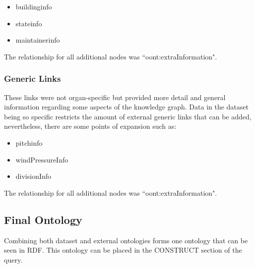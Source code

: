 \vspace{-0.15cm}
\begin{itemize}
    \itemsep0em 
    \vspace{-0.05cm}
    \item buildinginfo
    \vspace{-0.05cm}
    \item stateinfo
    \vspace{-0.05cm}
    \item maintainerinfo
    \vspace{-0.05cm}
\end{itemize}
\vspace{-0.1cm}

\noindent The relationship for all additional nodes was ``oont:extraInformation".

\subsubsection{Generic Links}
\hspace*{0.5cm} These links were not organ-specific but provided more detail and general information regarding some aspects of the knowledge graph. Data in the dataset being so specific restricts the amount of external generic links that can be added, nevertheless, there are some points of expansion such as:

\vspace{-0.15cm}
\begin{itemize}
    \itemsep0em 
    \vspace{-0.05cm}
    \item pitchinfo
    \vspace{-0.05cm}
    \item windPressureInfo
    \vspace{-0.05cm}
    \item divisionInfo
    \vspace{-0.1cm}
\end{itemize}
\vspace{-0.1cm}

\noindent The relationship for all additional nodes was ``oont:extraInformation".

\subsection{Final Ontology}
\hspace*{0.5cm} Combining both dataset and external ontologies forms one ontology that can be seen in RDF. This ontology can be placed in the CONSTRUCT section of the query.

